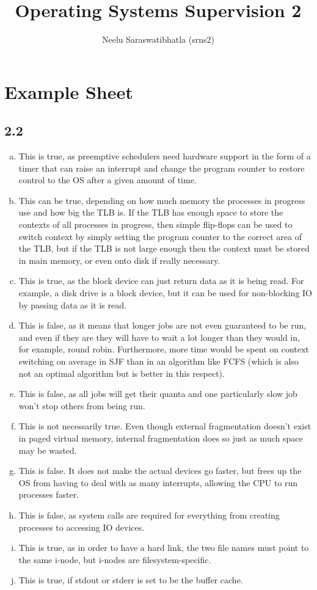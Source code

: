 \documentclass[12pt]{article}
\author{Neelu Saraswatibhatla (srns2)}
\title{Operating Systems Supervision 2}
\date{\vspace{-5ex}}
\begin{document}
\maketitle

\section{Example Sheet}

\subsection*{2.2}

\begin{enumerate}[(a)]
    \item This is true, as preemptive schedulers need hardware support in the form of a timer that can raise an interrupt and change the program counter to restore control to the OS after a given amount of time.
    \item This can be true, depending on how much memory the processes in progress use and how big the TLB is. If the TLB has enough space to store the contexts of all processes in progress, then simple flip-flops can be used to switch context by simply setting the program counter to the correct area of the TLB, but if the TLB is not large enough then the context must be stored in main memory, or even onto disk if really necessary.
    \item This is true, as the block device can just return data as it is being read. For example, a disk drive is a block device, but it can be used for non-blocking IO by passing data as it is read.
    \item This is false, as it means that longer jobs are not even guaranteed to be run, and even if they are they will have to wait a lot longer than they would in, for example, round robin. Furthermore, more time would be spent on context switching on average in SJF than in an algorithm like FCFS (which is also not an optimal algorithm but is better in this respect).
    \item This is false, as all jobs will get their quanta and one particularly slow job won't stop others from being run.
    \item This is not necessarily true. Even though external fragmentation doesn't exist in paged virtual memory, internal fragmentation does so just as much space may be wasted.
    \item This is false. It does not make the actual devices go faster, but frees up the OS from having to deal with as many interrupts, allowing the CPU to run processes faster.
    \item This is false, as system calls are required for everything from creating processes to accessing IO devices.
    \item This is true, as in order to have a hard link, the two file names must point to the same i-node, but i-nodes are filesystem-specific.
    \item This is true, if stdout or stderr is set to be the buffer cache.
\end{enumerate}
\end{document}
